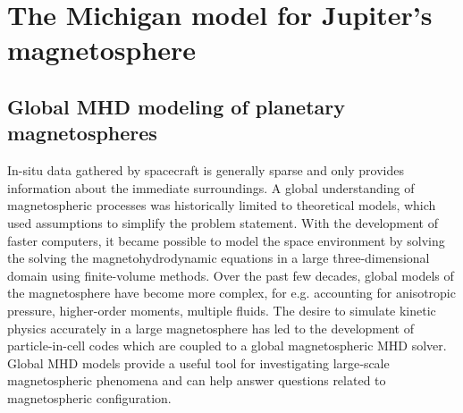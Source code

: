 
\chapter{The Michigan model for Jupiter's magnetosphere}

\section{Global MHD modeling of planetary magnetospheres}

In-situ data gathered by spacecraft is generally sparse and only provides information about the immediate surroundings. A global understanding of magnetospheric processes was historically limited to theoretical models, which used assumptions to simplify the problem statement. With the development of faster computers, it became possible to model the space environment by solving the solving the magnetohydrodynamic equations in a large three-dimensional domain using finite-volume methods. Over the past few decades, global models of the magnetosphere have become more complex, for e.g. accounting for anisotropic pressure, higher-order moments, multiple fluids. The desire to simulate kinetic physics accurately in a large magnetosphere has led to the development of particle-in-cell codes which are coupled to a global magnetospheric MHD solver. Global MHD models provide a useful tool for investigating large‐scale magnetospheric phenomena and can help answer questions related to magnetospheric configuration. 

